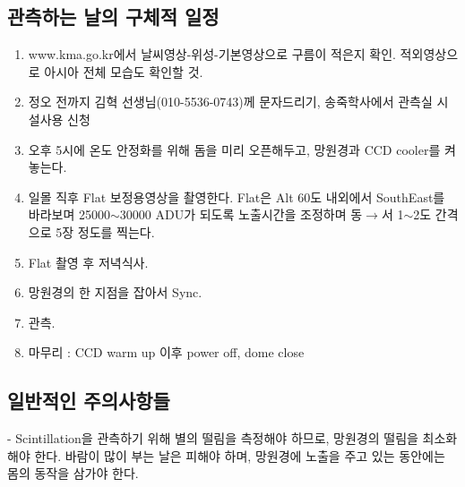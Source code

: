 \documentclass[12pt]{article}
\begin{document}
\subsection{관측하는 날의 구체적 일정}
\begin{enumerate}
	\item www.kma.go.kr\cite{kma}에서 날씨영상-위성-기본영상으로 구름이 적은지 확인. 적외영상으로 아시아 전체 모습도 확인할 것.
	
	\item 정오 전까지 김혁 선생님(010-5536-0743)께 문자드리기, 송죽학사에서 관측실 시설사용 신청
	
	\item 오후 5시에 온도 안정화를 위해 돔을 미리 오픈해두고, 망원경과 CCD cooler를 켜놓는다.
	
	\item 일몰 직후 Flat 보정용영상을 촬영한다. Flat은 Alt 60도 내외에서 SouthEast를 바라보며 25000$\sim$30000 ADU가 되도록 노출시간을 조정하며 동$\longrightarrow$서 1$\sim$2도 간격으로 5장 정도를 찍는다.
	
	\item Flat 촬영 후 저녁식사.
	
	\item 망원경의 한 지점을 잡아서 Sync.
	
	\item 관측.
	
	\item 마무리 : CCD warm up 이후 power off, dome close
	
\end{enumerate}

\subsection{일반적인 주의사항들}
- Scintillation을 관측하기 위해 별의 떨림을 측정해야 하므로, 망원경의 떨림을 최소화해야 한다. 바람이 많이 부는 날은 피해야 하며, 망원경에 노출을 주고 있는 동안에는 몸의 동작을 삼가야 한다.
\end{document}
